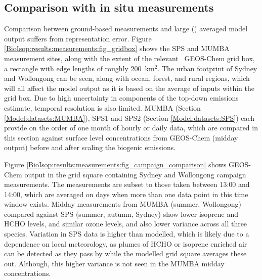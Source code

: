   
  \subsection{Comparison with in situ measurements}
    \label{BioIsop:results:measurements}
    
    Comparison between ground-based measurements and large (\lowhr) averaged model output suffers from representation error.
    Figure \ref{BioIsop:results:measurements:fig_gridbox} shows the SPS and MUMBA measurement sites, along with the extent of the relevant \lowhr ~GEOS-Chem grid box, a rectangle with edge lengths of roughly 200~km$^{2}$.
    The urban footprint of Sydney and Wollongong can be seen, along with ocean, forest, and rural regions, which will all affect the model output as it is based on the average of inputs within the grid box.
    Due to high uncertainty in components of the top-down emissions estimate, temporal resolution is also limited.
    MUMBA (Section \ref{Model:datasets:MUMBA}), SPS1 and SPS2 (Section \ref{Model:datasets:SPS}) each provide on the order of one month of hourly or daily data, which are compared in this section against surface level concentrations from GEOS-Chem (midday output) before and after scaling the biogenic emissions.
    
    
    
    Figure \ref{BioIsop:results:measurements:fig_campaign_comparison} shows GEOS-Chem output in the grid square containing Sydney and Wollongong campaign measurements.
    The measurements are subset to those taken between 13:00 and 14:00, which are averaged on days when more than one data point in this time window exists.
    Midday measurements from MUMBA (summer, Wollongong) compared against SPS (summer, autumn, Sydney) show lower isoprene and HCHO levels, and similar ozone levels, and also lower variance across all three species.
    Variation in SPS data is higher than modelled, which is likely due to a dependence on local meteorology, as plumes of HCHO or isoprene enriched air can be detected as they pass by while the modelled grid square averages these out.
    Although, this higher variance is not seen in the MUMBA midday concentrations.
    
